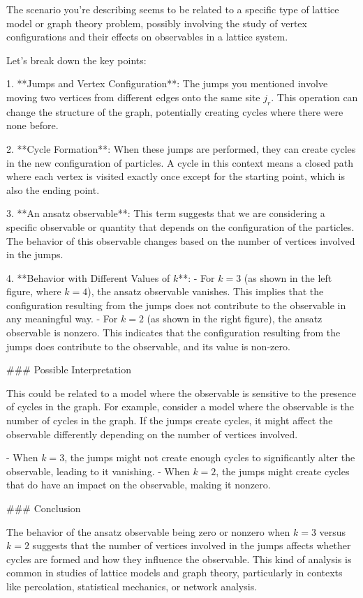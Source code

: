The scenario you're describing seems to be related to a specific type of lattice model or graph theory problem, possibly involving the study of vertex configurations and their effects on observables in a lattice system.

Let's break down the key points:

1. **Jumps and Vertex Configuration**: The jumps you mentioned involve moving two vertices from different edges onto the same site \(j_r\). This operation can change the structure of the graph, potentially creating cycles where there were none before.

2. **Cycle Formation**: When these jumps are performed, they can create cycles in the new configuration of particles. A cycle in this context means a closed path where each vertex is visited exactly once except for the starting point, which is also the ending point.

3. **An ansatz observable**: This term suggests that we are considering a specific observable or quantity that depends on the configuration of the particles. The behavior of this observable changes based on the number of vertices involved in the jumps.

4. **Behavior with Different Values of \(k\)**:
   - For \(k = 3\) (as shown in the left figure, where \(k = 4\)), the ansatz observable vanishes. This implies that the configuration resulting from the jumps does not contribute to the observable in any meaningful way.
   - For \(k = 2\) (as shown in the right figure), the ansatz observable is nonzero. This indicates that the configuration resulting from the jumps does contribute to the observable, and its value is non-zero.

### Possible Interpretation

This could be related to a model where the observable is sensitive to the presence of cycles in the graph. For example, consider a model where the observable is the number of cycles in the graph. If the jumps create cycles, it might affect the observable differently depending on the number of vertices involved.

- When \(k = 3\), the jumps might not create enough cycles to significantly alter the observable, leading to it vanishing.
- When \(k = 2\), the jumps might create cycles that do have an impact on the observable, making it nonzero.

### Conclusion

The behavior of the ansatz observable being zero or nonzero when \(k = 3\) versus \(k = 2\) suggests that the number of vertices involved in the jumps affects whether cycles are formed and how they influence the observable. This kind of analysis is common in studies of lattice models and graph theory, particularly in contexts like percolation, statistical mechanics, or network analysis.